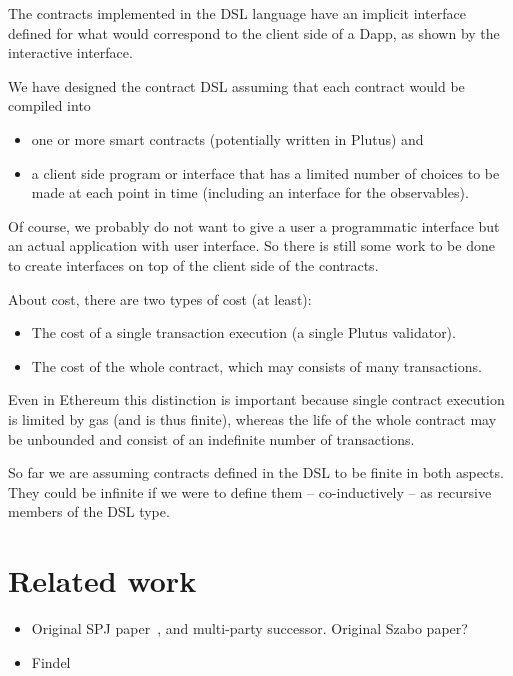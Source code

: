 \documentclass[
      acmsmall
    , screen
    , review=true
  ]{acmart}
\begin{document}
The contracts implemented in the DSL language have an implicit interface defined for what would correspond to the client side of a Dapp, as shown by the interactive interface. 


We have designed the contract DSL assuming that each contract would be compiled into
\begin{itemize} 
\item one or more smart contracts (potentially written in Plutus) and 
\item a client side program or interface that has a limited number of choices to be made at each point in time (including an interface for the observables). 
\end{itemize} 


Of course, we probably do not want to give a user a programmatic interface but an actual application with user interface. So there is still some work to be done to create interfaces on top of the client side of the contracts.


About cost, there are two types of cost (at least):

\begin{itemize} 
\item The cost of a single transaction execution (a single Plutus validator).
\item The cost of the whole contract, which may consists of many transactions.
\end{itemize} 


Even in Ethereum this distinction is important because single contract execution is limited by gas (and is thus finite), whereas the life of the whole contract may be unbounded and consist of an indefinite number of transactions. 


So far we are assuming contracts defined in the DSL to be finite in both aspects. They could be infinite if we were to define them -- co-inductively -- as recursive members of the DSL type.

\section{Related work}

\begin{itemize}
\item Original SPJ paper~\cite{PeytonJones:2000}, and multi-party successor. Original Szabo paper?
\item Findel~\cite{findel}
\end{itemize}
\end{document}
